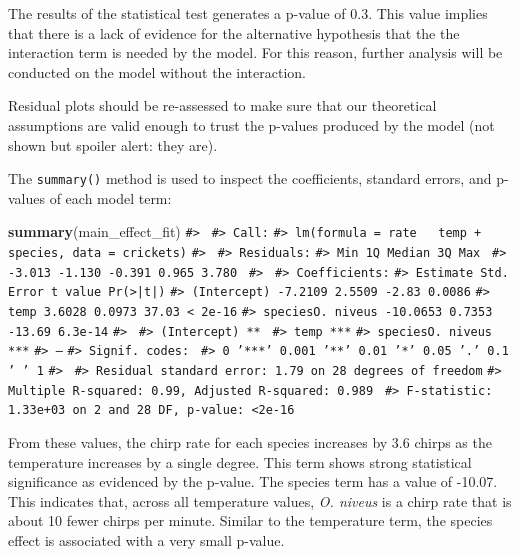 \documentclass[11pt]{book}
\newenvironment{Shaded}{\begin{snugshade}}{\end{snugshade}}
\newcommand{\CommentTok}[1]{\textcolor[rgb]{0.56,0.35,0.01}{\textit{#1}}}
\newcommand{\KeywordTok}[1]{\textcolor[rgb]{0.13,0.29,0.53}{\textbf{#1}}}
\newcommand{\NormalTok}[1]{#1}
\renewcommand{\CommentTok}[1]{\textcolor[rgb]{0.41,0.41,0.41}{\texttt{#1}}}
\begin{document}
The results of the statistical test generates a p-value of 0.3. This value implies that there is a lack of evidence for the alternative hypothesis that the the interaction term is needed by the model. For this reason, further analysis will be conducted on the model without the interaction.

Residual plots should be re-assessed to make sure that our theoretical assumptions are valid enough to trust the p-values produced by the model (not shown but spoiler alert: they are).

The \texttt{summary()} method is used to inspect the coefficients, standard errors, and p-values of each model term:

\begin{Shaded}
\begin{Highlighting}[]
\KeywordTok{summary}\NormalTok{(main_effect_fit)}
\CommentTok{#> }
\CommentTok{#> Call:}
\CommentTok{#> lm(formula = rate ~ temp + species, data = crickets)}
\CommentTok{#> }
\CommentTok{#> Residuals:}
\CommentTok{#>    Min     1Q Median     3Q    Max }
\CommentTok{#> -3.013 -1.130 -0.391  0.965  3.780 }
\CommentTok{#> }
\CommentTok{#> Coefficients:}
\CommentTok{#>                  Estimate Std. Error t value Pr(>|t|)}
\CommentTok{#> (Intercept)       -7.2109     2.5509   -2.83   0.0086}
\CommentTok{#> temp               3.6028     0.0973   37.03  < 2e-16}
\CommentTok{#> speciesO. niveus -10.0653     0.7353  -13.69  6.3e-14}
\CommentTok{#>                     }
\CommentTok{#> (Intercept)      ** }
\CommentTok{#> temp             ***}
\CommentTok{#> speciesO. niveus ***}
\CommentTok{#> ---}
\CommentTok{#> Signif. codes:  }
\CommentTok{#> 0 '***' 0.001 '**' 0.01 '*' 0.05 '.' 0.1 ' ' 1}
\CommentTok{#> }
\CommentTok{#> Residual standard error: 1.79 on 28 degrees of freedom}
\CommentTok{#> Multiple R-squared:  0.99,   Adjusted R-squared:  0.989 }
\CommentTok{#> F-statistic: 1.33e+03 on 2 and 28 DF,  p-value: <2e-16}
\end{Highlighting}
\end{Shaded}

From these values, the chirp rate for each species increases by 3.6 chirps as the temperature increases by a single degree. This term shows strong statistical significance as evidenced by the p-value. The species term has a value of -10.07. This indicates that, across all temperature values, \emph{O. niveus} is a chirp rate that is about 10 fewer chirps per minute. Similar to the temperature term, the species effect is associated with a very small p-value.
\end{document}
